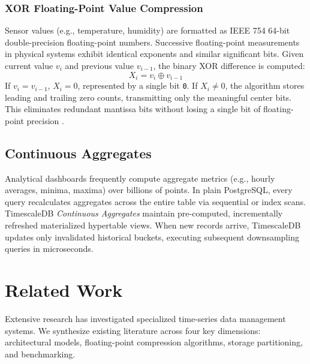 \documentclass[conference,a4paper]{IEEEtran}
\begin{document}
\subsubsection{XOR Floating-Point Value Compression}
Sensor values (e.g., temperature, humidity) are formatted as IEEE 754 64-bit double-precision floating-point numbers. Successive floating-point measurements in physical systems exhibit identical exponents and similar significant bits. Given current value $v_i$ and previous value $v_{i-1}$, the binary XOR difference is computed:
\begin{equation}
    X_i = v_i \oplus v_{i-1}
\end{equation}
If $v_i = v_{i-1}$, $X_i = 0$, represented by a single bit \texttt{0}. If $X_i \neq 0$, the algorithm stores leading and trailing zero counts, transmitting only the meaningful center bits. This eliminates redundant mantissa bits without losing a single bit of floating-point precision \cite{pelkonen2015gorilla, qiao2022chimp}.

\subsection{Continuous Aggregates}
Analytical dashboards frequently compute aggregate metrics (e.g., hourly averages, minima, maxima) over billions of points. In plain PostgreSQL, every query recalculates aggregates across the entire table via sequential or index scans. TimescaleDB \textit{Continuous Aggregates} maintain pre-computed, incrementally refreshed materialized hypertable views. When new records arrive, TimescaleDB updates only invalidated historical buckets, executing subsequent downsampling queries in microseconds.

\section{Related Work}
Extensive research has investigated specialized time-series data management systems. We synthesize existing literature across four key dimensions: architectural models, floating-point compression algorithms, storage partitioning, and benchmarking.
\end{document}
